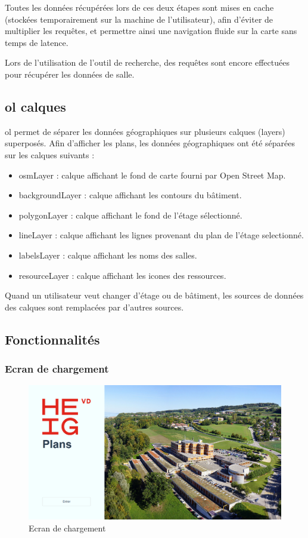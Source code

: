 \documentclass[
    iai, %
    il, %
]{heig-tb}
\begin{document}
Toutes les données récupérées lors de ces deux étapes sont mises en cache (stockées temporairement sur la machine de l'utilisateur),
afin d'éviter de multiplier les requêtes, et permettre ainsi une navigation fluide sur la carte sans temps de latence.

Lors de l'utilisation de l'outil de recherche, des requêtes sont encore effectuées pour récupérer les données de salle.

\subsection{\gls{ol} calques}
\gls{ol} permet de séparer les données géographiques sur plusieurs calques (layers) superposés.
Afin d'afficher les plans, les données géographiques ont été séparées sur les calques suivants :

\begin{itemize}
    \item osmLayer : calque affichant le fond de carte fourni par Open Street Map.
    \item backgroundLayer : calque affichant les contours du bâtiment.
    \item polygonLayer : calque affichant le fond de l'étage sélectionné.
    \item lineLayer : calque affichant les lignes provenant du plan de l'étage selectionné.
    \item labelsLayer : calque affichant les noms des salles.
    \item resourceLayer : calque affichant les icones des ressources.
\end{itemize}

Quand un utilisateur veut changer d'étage ou de bâtiment, les sources de données des calques sont remplacées par d'autres sources.

\subsection{Fonctionnalités}

\subsubsection{Ecran de chargement}

\begin{figure}[h]
    \centering
    \includegraphics[scale=0.3]{frontend-loading-screen.png}
    \caption{Ecran de chargement}
    \label{fig:ecran-chargement}
\end{figure}
\end{document}
